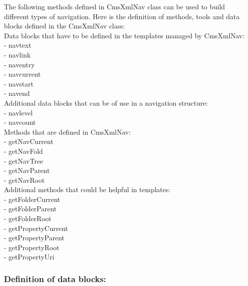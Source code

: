 The following methods defined in CmsXmlNav class can be used 
to build different types of navigation. Here is the definition 
of methods, tools and data blocks defined in the CmsXmlNav 
class: \\

Data blocks that have to be defined in the templates managed 
by CmsXmlNav: \\

- navtext  \\
- navlink  \\
- naventry  \\
- navcurrent  \\
- navstart  \\
- navend  \\

Additional data blocks that can be of use in a navigation structure: \\

- navlevel  \\
- navcount  \\

Methods that are defined in CmsXmlNav: \\

- getNavCurrent  \\
- getNavFold  \\
- getNavTree  \\
- getNavParent  \\
- getNavRoot  \\


Additional methods that could be helpful in templates: \\

- getFolderCurrent  \\
- getFolderParent  \\
- getFolderRoot  \\
- getPropertyCurrent  \\
- getPropertyParent  \\
- getPropertyRoot  \\
- getPropertyUri  \\
\subsubsection{Definition of data blocks:}
